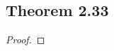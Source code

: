 \documentclass[../../main.tex]{subfiles}
\begin{document}
\subsection{Theorem 2.33}
\begin{wts}

\end{wts}
\begin{proof}

\end{proof}
\end{document}
